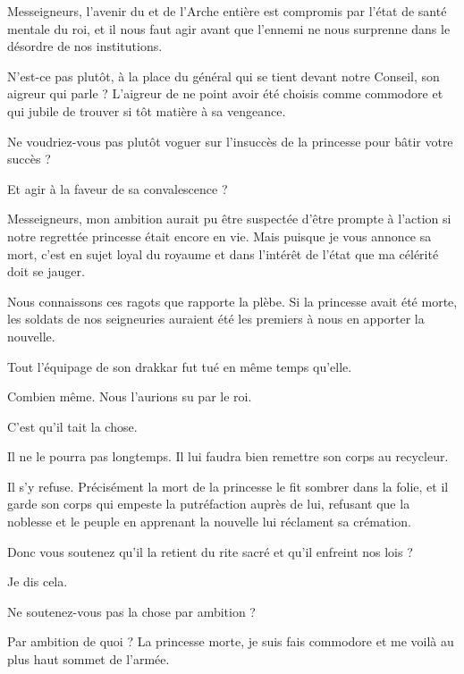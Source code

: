 \begin{drama}
  \generalspeaks Messeigneurs, l’avenir du \campprincipal{} et de l’Arche entière est compromis par l’état de santé mentale du roi,  et il nous faut agir avant que l’ennemi ne nous surprenne dans le désordre de nos institutions.

  \nobleOnespeaks N’est-ce pas plutôt, à la place du  général qui se tient devant notre Conseil, son aigreur qui parle ? L’aigreur de ne point avoir été choisis comme commodore et qui jubile de trouver si tôt matière à sa vengeance.

  \nobleTwospeaks Ne voudriez-vous pas plutôt voguer sur l’insuccès de la princesse pour bâtir votre succès ?

  \nobleTreespeaks Et agir à la faveur de sa convalescence ?

  \generalspeaks Messeigneurs, mon  ambition aurait pu être suspectée  d’être prompte à l’action si notre regrettée princesse était encore en vie. Mais puisque je vous annonce sa mort, c’est en sujet loyal du royaume et dans l’intérêt de l’état que ma célérité doit se jauger.

  \nobleOnespeaks Nous connaissons ces ragots que rapporte la plèbe. Si la princesse avait été morte, les soldats de nos seigneuries auraient été les premiers à nous en apporter la nouvelle.

  \generalspeaks Tout l’équipage de son drakkar fut tué en même temps qu’elle.

  \nobleTwospeaks Combien même. Nous l’aurions su par le roi.

  \generalspeaks C’est qu’il tait la chose.

  \nobleTreespeaks Il ne le pourra pas longtemps. Il lui faudra bien remettre son corps au recycleur.

  \generalspeaks Il s’y refuse. Précisément la mort de la princesse le fit sombrer dans la folie, et il garde son corps qui empeste la putréfaction auprès de lui, refusant que la noblesse et le peuple en apprenant la nouvelle lui réclament sa crémation.

  \nobleTreespeaks Donc vous soutenez qu’il la retient du rite sacré et qu’il enfreint nos lois ?

  \generalspeaks Je dis cela.

  \nobleTwospeaks Ne soutenez-vous pas la chose par ambition ?

  \generalspeaks Par ambition de quoi ? La princesse morte, je suis fais commodore et me voilà au plus haut sommet de l’armée.


\end{drama}

